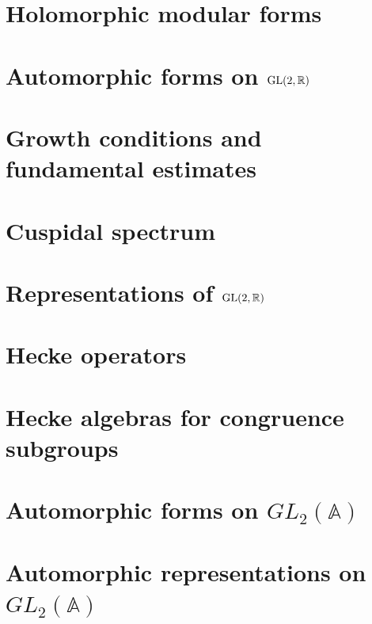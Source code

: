 \documentclass[a4paper,10pt]{article}
\begin{document}
\section{Holomorphic modular forms}

\newpage

\section{Automorphic forms on $\operatorname{GL}(2,\mathbb R)$}

\newpage

\section{Growth conditions and fundamental estimates}

\newpage

\section{Cuspidal spectrum}

\newpage

\section{Representations of $\operatorname{GL}(2,\mathbb R)$}

\newpage

\section{Hecke operators}

\newpage

\section{Hecke algebras for congruence subgroups}

\newpage

\section{Automorphic forms on $GL_2(\mathbb A)$}

\newpage

\section{Automorphic representations on $GL_2(\mathbb A)$}

\newpage
\end{document}
